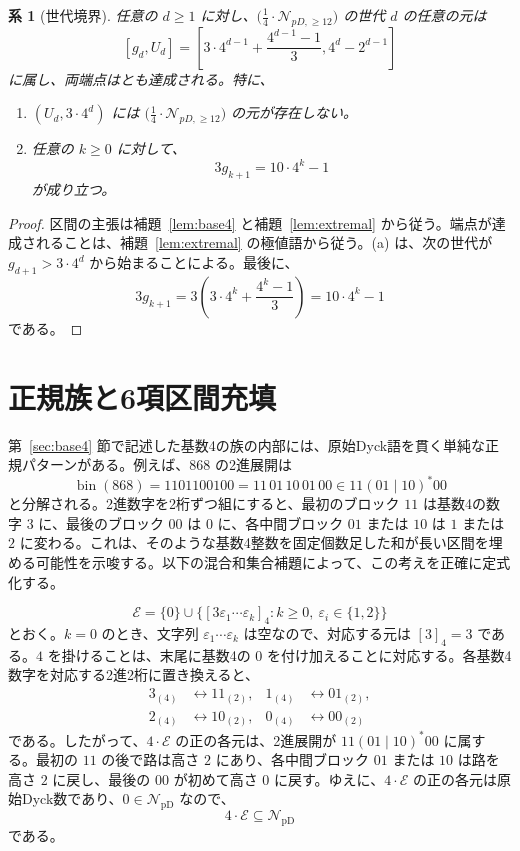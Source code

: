 \documentclass[12pt]{ltjsarticle}
\theoremstyle{plain}
\newtheorem{corollary}[theorem]{系}
\theoremstyle{definition}
\theoremstyle{plain}
\newcommand{\val}[2]{[#1]_{#2}}
\newcommand{\NpD}{\mathcal{N}_{\mathrm{pD}}}
\newcommand{\Pset}{
  \bigl(\tfrac{1}{4}\cdot\mathcal{N}_{pD,\geq 12}\bigr)
}
\begin{document}
\begin{corollary}[世代境界]\label{cor:gen}
任意の $d\geq1$ に対し、$\Pset$ の世代 $d$ の任意の元は
\begin{equation}\label{eq:generation-interval}
  [g_d,U_d]
  =\left[
  3\cdot4^{d-1}+\frac{4^{d-1}-1}{3},
  4^d-2^{d-1}
  \right]
\end{equation}
に属し、両端点はとも達成される。特に、
\begin{enumerate}[label=\textup{(\alph*)}]
\item $(U_d,3\cdot4^d)$ には $\Pset$ の元が存在しない。
\item 任意の $k\geq0$ に対して、
\begin{equation}\label{eq:three-g}
  3g_{k+1}=10\cdot4^k-1
\end{equation}
が成り立つ。
\end{enumerate}
\end{corollary}

\begin{proof}
区間の主張は補題~\ref{lem:base4} と補題~\ref{lem:extremal} から従う。端点が達成されることは、補題~\ref{lem:extremal} の極値語から従う。(a) は、次の世代が $g_{d+1}>3\cdot4^d$ から始まることによる。最後に、
\[
  3g_{k+1}
  =3\left(3\cdot4^k+\frac{4^k-1}{3}\right)
  =10\cdot4^k-1
\]
である。
\end{proof}

\section{正規族と6項区間充填}\label{sec:regular}

第~\ref{sec:base4} 節で記述した基数4の族の内部には、原始Dyck語を貫く単純な正規パターンがある。例えば、$868$ の2進展開は
\[
 \operatorname{bin}(868)=1101100100=11\,01\,10\,01\,00
 \in 11(01\mid10)^*00
\]
と分解される。2進数字を2桁ずつ組にすると、最初のブロック $11$ は基数4の数字 $3$ に、最後のブロック $00$ は $0$ に、各中間ブロック $01$ または $10$ は $1$ または $2$ に変わる。これは、そのような基数4整数を固定個数足した和が長い区間を埋める可能性を示唆する。以下の混合和集合補題によって、この考えを正確に定式化する。

\[
 \mathcal E=\{0\}\cup
 \bigl\{\val{3\varepsilon_1\cdots\varepsilon_k}{4}:
        k\geq0,\ \varepsilon_i\in\{1,2\}\bigr\}
\]
とおく。$k=0$ のとき、文字列 $\varepsilon_1\cdots\varepsilon_k$ は空なので、対応する元は $\val{3}{4}=3$ である。$4$ を掛けることは、末尾に基数4の $0$ を付け加えることに対応する。各基数4数字を対応する2進2桁に置き換えると、
\[
\begin{aligned}
 3_{(4)}&\longleftrightarrow11_{(2)},&
 1_{(4)}&\longleftrightarrow01_{(2)},\\
 2_{(4)}&\longleftrightarrow10_{(2)},&
 0_{(4)}&\longleftrightarrow00_{(2)}
\end{aligned}
\]
である。したがって、$4\cdot\mathcal E$ の正の各元は、2進展開が $11(01\mid10)^*00$ に属する。最初の $11$ の後で路は高さ $2$ にあり、各中間ブロック $01$ または $10$ は路を高さ $2$ に戻し、最後の $00$ が初めて高さ $0$ に戻す。ゆえに、$4\cdot\mathcal E$ の正の各元は原始Dyck数であり、$0\in\NpD$ なので、
\begin{equation}\label{eq:4E}
        4\cdot\mathcal E\subseteq\NpD
\end{equation}
である。
\end{document}

